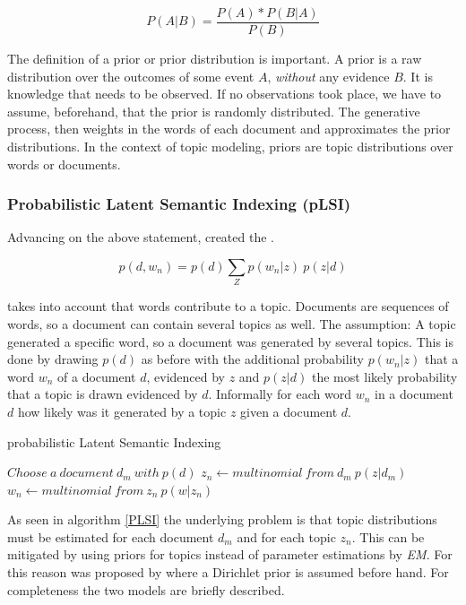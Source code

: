           \begin{equation}
            P(A|B) = \frac{P(A) * P(B|A)}{P(B)}
          \end{equation}
        
        The definition of a prior or prior distribution is important. A prior is a raw distribution over the outcomes of some event $A$, \emph{without} any evidence $B$. It is knowledge that needs to be observed. If no observations took place, we have to assume, beforehand, that the prior is randomly distributed. The generative process, then weights in the words of each document and approximates the prior distributions. In the context of topic modeling, priors are topic distributions over words or documents. 
        
      \subsubsection*{Probabilistic Latent Semantic Indexing (pLSI)}
      Advancing on the above statement, \cite{PLSA2001} created the \plsifull{}.

        \begin{equation}
          p(d, w_n) = p(d)\sum_{Z} p(w_n|z)\:p(z|d)
        \end{equation} 

      \plsi{} takes into account that words contribute to a topic. Documents are sequences of words, so a document can contain several topics as well. The assumption: A topic generated a specific word, so a document was generated by several topics. This is done by drawing $p(d)$ as before with the additional probability $p(w_n|z)$ that a word $w_n$ of a document $d$, evidenced by $z$ and $p(z|d)$ the most likely probability that a topic is drawn evidenced by $d$. Informally for each word $w_n$ in a document $d$ how likely was it generated by a topic $z$ given a document $d$.

      \begin{algorithm}[H]
      \begin{algorithmic}[1]
        \caption{probabilistic Latent Semantic Indexing}\label{PLSI}
        \State $Choose\:a\:document\:d_m\:with\:p(d)$
            \State $z_n \gets multinomial\:from\:d_m\:p(z|d_m)$
            \State $w_n \gets multinomial\:from\:z_n\:p(w|z_n)$
          \EndFor
      \end{algorithmic}
      \end{algorithm}

      As seen in algorithm \ref{PLSI} the underlying problem is that topic distributions must be estimated for each document $d_m$ and for each topic $z_n$. This can be mitigated by using priors for topics instead of parameter estimations by \emph{EM}. For this reason \ldafull{} was proposed by \cite{LDA2003} where a Dirichlet prior is assumed before hand. For completeness the two models are briefly described.


